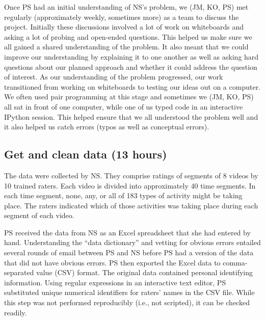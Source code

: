 \documentclass[]{article}
\begin{document}
Once PS had an initial understanding of NS's problem, we (JM, KO, PS) met
regularly (approximately weekly, sometimes more) as a team to discuss the
project.
Initially these discussions involved a lot of work on whiteboards and asking a
lot of probing and open-ended questions.
This helped us make sure we all gained a shared understanding of the problem.
It also meant that we could improve our understanding by explaining it to one
another as well as asking hard questions about our planned approach and whether
it could address the question of interest.
As our understanding of the problem progressed, our work transitioned from
working on whiteboards to testing our ideas out on a computer.
We often used pair programming at this stage and sometimes we (JM, KO, PS)
all sat in front of one computer, while one of us typed code in an interactive
IPython session.
This helped ensure that we all understood the problem well and it also helped
us catch errors (typos as well as conceptual errors).

\subsection{Get and clean data (13 hours)}

The data were collected by NS.
They comprise ratings of segments of 8 videos by 10 trained raters.
Each video is divided into approximately 40 time segments.
In each time segment, none, any, or all of 183 types of activity might be
taking place.
The raters indicated which of those activities was taking place during each
segment of each video.

PS received the data from NS as an Excel spreadsheet that she had entered
by hand.
Understanding the ``data dictionary'' and vetting for obvious errors entailed
several rounds of email between PS and NS before PS had a version of the data
that did not have obvious errors.
PS then exported the Excel data to comma-separated value (CSV) format.
The original data contained personal identifying information.
Using regular expressions in an interactive text editor, PS substituted
unique numerical identifiers for raters' names in the CSV file.
While this step was not performed reproducibly (i.e., not scripted), it can be
checked readily.
\end{document}
